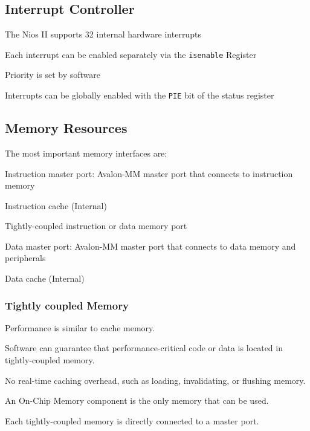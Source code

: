 	\subsection{Interrupt Controller }
		\begin{multicols}{2}
			\begin{compactitem}
				\item The Nios II supports 32 internal hardware interrupts				
				\item Each interrupt can be enabled separately via the \lstinline[style=C]{isenable} Register
				\item Priority is set by software
				\item Interrupts can be globally enabled with the \lstinline[style=C]{PIE} bit of the status register
			\end{compactitem}
		\end{multicols}
	
	\subsection{Memory Resources \weekMaehne{2}}
		The most important memory interfaces are:
		\begin{multicols}{2}
			\begin{compactitem}
				\item Instruction master port: Avalon-MM master port that connects to instruction memory
				\item Instruction cache (Internal)
				\item Tightly-coupled instruction or data memory port
				\item Data master port: Avalon-MM master port that connects to data memory and peripherals
				\item Data cache (Internal)				
			\end{compactitem}
		\end{multicols}
	
		\subsubsection{Tightly coupled Memory \weekPageMaehne{2}{14}}
			\begin{multicols}{2}
				\begin{compactitem}
					\item Performance is similar to cache memory.
					\item Software can guarantee that performance-critical code or data is located in tightly-coupled memory.
					\item No real-time caching overhead, such as loading, invalidating, or flushing memory.
					\item An On-Chip Memory component is the only memory that can be used.
					\item Each tightly-coupled memory is directly connected to a master port.
				\end{compactitem}
			\end{multicols}